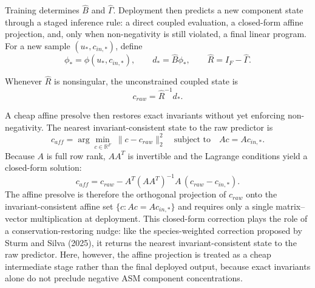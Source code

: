 \documentclass[a4paper,fleqn]{cas-sc}
\newenvironment{revblock}{\begingroup\color{revDefault}}{\endgroup}
\begin{document}
\begin{revblock}
Training determines $\widehat{B}$ and $\widehat{\Gamma}$. Deployment then predicts a new component state through a staged inference rule: a direct coupled evaluation, a closed-form affine projection, and, only when non-negativity is still violated, a final linear program. For a new sample $(u_*, c_{in,*})$, define
\begin{equation}
\label{eq:deployment-definitions}
\phi_* = \phi(u_*, c_{in,*}), \qquad d_* = \widehat{B}\phi_*, \qquad \widehat{R} = I_F - \widehat{\Gamma}.
\end{equation}

Whenever $\widehat{R}$ is nonsingular, the unconstrained coupled state is
\begin{equation}
\label{eq:raw-coupled-state}
 c_{raw} = \widehat{R}^{-1} d_*.
\end{equation}

A cheap affine presolve then restores exact invariants without yet enforcing non-negativity. The nearest invariant-consistent state to the raw predictor is
\begin{equation}
\label{eq:affine-presolve}
 c_{aff} = \arg\min_{c \in \mathbb{R}^{F}} \; \|c - c_{raw}\|_2^2 \quad \text{subject to} \quad A c = A c_{in,*}.
\end{equation}
Because $A$ is full row rank, $AA^T$ is invertible and the Lagrange conditions yield a closed-form solution:
\begin{equation}
\label{eq:affine-closed-form}
 c_{aff} = c_{raw} - A^T(AA^T)^{-1}A\,(c_{raw} - c_{in,*}).
\end{equation}
The affine presolve is therefore the orthogonal projection of $c_{raw}$ onto the invariant-consistent affine set $\{c : Ac = Ac_{in,*}\}$ and requires only a single matrix--vector multiplication at deployment. This closed-form correction plays the role of a conservation-restoring nudge: like the species-weighted correction proposed by Sturm and Silva (2025), it returns the nearest invariant-consistent state to the raw predictor. Here, however, the affine projection is treated as a cheap intermediate stage rather than the final deployed output, because exact invariants alone do not preclude negative ASM component concentrations.


\end{revblock}
\end{document}
